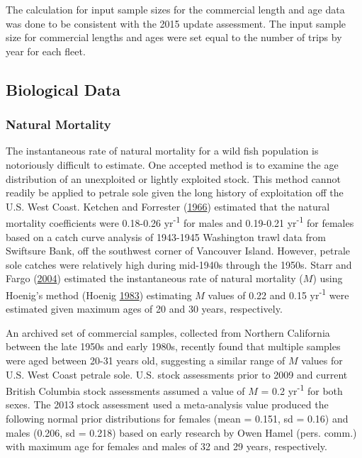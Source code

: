 \documentclass[12pt,]{article}
\begin{document}
The calculation for input sample sizes for the commercial length and age
data was done to be consistent with the 2015 update assessment. The
input sample size for commercial lengths and ages were set equal to the
number of trips by year for each fleet.

\subsection{Biological Data}\label{biological-data}

\subsubsection{Natural Mortality}\label{natural-mortality}

The instantaneous rate of natural mortality for a wild fish population
is notoriously difficult to estimate. One accepted method is to examine
the age distribution of an unexploited or lightly exploited stock. This
method cannot readily be applied to petrale sole given the long history
of exploitation off the U.S. West Coast. Ketchen and Forrester
(\protect\hyperlink{ref-ketchen_population_1966}{1966}) estimated that
the natural mortality coefficients were 0.18-0.26 yr\textsuperscript{-1}
for males and 0.19-0.21 yr\textsuperscript{-1} for females based on a
catch curve analysis of 1943-1945 Washington trawl data from Swiftsure
Bank, off the southwest corner of Vancouver Island. However, petrale
sole catches were relatively high during mid-1940s through the 1950s.
Starr and Fargo (\protect\hyperlink{ref-starr_petrale_2004}{2004})
estimated the instantaneous rate of natural mortality (\(M\)) using
Hoenig's method (Hoenig
\protect\hyperlink{ref-hoenig_empirical_1983}{1983}) estimating \(M\)
values of 0.22 and 0.15 yr\textsuperscript{-1} were estimated given
maximum ages of 20 and 30 years, respectively.

An archived set of commercial samples, collected from Northern
California between the late 1950s and early 1980s, recently found that
multiple samples were aged between 20-31 years old, suggesting a similar
range of \(M\) values for U.S. West Coast petrale sole. U.S. stock
assessments prior to 2009 and current British Columbia stock assessments
assumed a value of \(M\) = 0.2 yr\textsuperscript{-1} for both sexes.
The 2013 stock assessment used a meta-analysis value produced the
following normal prior distributions for females (mean = 0.151, sd =
0.16) and males (0.206, sd = 0.218) based on early research by Owen
Hamel (pers. comm.) with maximum age for females and males of 32 and 29
years, respectively.
\end{document}
